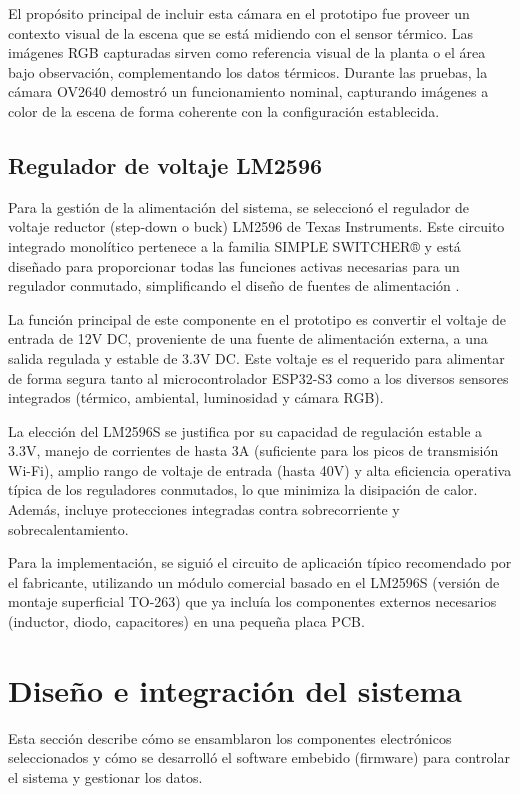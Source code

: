     El propósito principal de incluir esta cámara en el prototipo fue proveer un contexto visual de la escena que se está midiendo con el sensor térmico. Las imágenes RGB capturadas sirven como referencia visual de la planta o el área bajo observación, complementando los datos térmicos. Durante las pruebas, la cámara OV2640 demostró un funcionamiento nominal, capturando imágenes a color de la escena de forma coherente con la configuración establecida.

    \subsection{Regulador de voltaje LM2596}
    \label{subsec:hardware_lm2596}
    Para la gestión de la alimentación del sistema, se seleccionó el regulador de voltaje reductor (step-down o buck) LM2596 de Texas Instruments. Este circuito integrado monolítico pertenece a la familia SIMPLE SWITCHER® y está diseñado para proporcionar todas las funciones activas necesarias para un regulador conmutado, simplificando el diseño de fuentes de alimentación .

    La función principal de este componente en el prototipo es convertir el voltaje de entrada de 12V DC, proveniente de una fuente de alimentación externa, a una salida regulada y estable de 3.3V DC. Este voltaje es el requerido para alimentar de forma segura tanto al microcontrolador ESP32-S3 como a los diversos sensores integrados (térmico, ambiental, luminosidad y cámara RGB).

    La elección del LM2596S  se justifica por su capacidad de regulación estable a 3.3V, manejo de corrientes de hasta 3A (suficiente para los picos de transmisión Wi-Fi), amplio rango de voltaje de entrada (hasta 40V) y alta eficiencia operativa típica de los reguladores conmutados, lo que minimiza la disipación de calor. Además, incluye protecciones integradas contra sobrecorriente y sobrecalentamiento.

    Para la implementación, se siguió el circuito de aplicación típico recomendado por el fabricante, utilizando un módulo comercial basado en el LM2596S (versión de montaje superficial TO-263) que ya incluía los componentes externos necesarios (inductor, diodo, capacitores) en una pequeña placa PCB.

\section{Diseño e integración del sistema}
\label{sec:hardware_integracion}
Esta sección describe cómo se ensamblaron los componentes electrónicos seleccionados y cómo se desarrolló el software embebido (firmware) para controlar el sistema y gestionar los datos.

